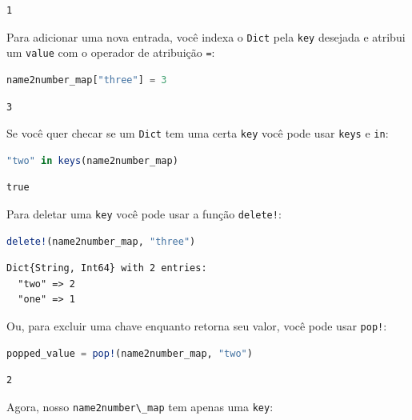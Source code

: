 \documentclass[
  notoc %
]{tufte-book}
\newcommand{\passthrough}[1]{#1}
\begin{document}
\begin{lstlisting}[language=Output]
1
\end{lstlisting}

Para adicionar uma nova entrada, você indexa o
\passthrough{\lstinline!Dict!} pela \passthrough{\lstinline!key!}
desejada e atribui um \passthrough{\lstinline!value!} com o operador de
atribuição \passthrough{\lstinline!=!}:

\begin{lstlisting}[language=Julia]
name2number_map["three"] = 3
\end{lstlisting}

\begin{lstlisting}[language=Output]
3
\end{lstlisting}

Se você quer checar se um \passthrough{\lstinline!Dict!} tem uma certa
\passthrough{\lstinline!key!} você pode usar
\passthrough{\lstinline!keys!} e \passthrough{\lstinline!in!}:

\begin{lstlisting}[language=Julia]
"two" in keys(name2number_map)
\end{lstlisting}

\begin{lstlisting}[language=Output]
true
\end{lstlisting}

Para deletar uma \passthrough{\lstinline!key!} você pode usar a função
\passthrough{\lstinline"delete!"}:

\begin{lstlisting}[language=Julia]
delete!(name2number_map, "three")
\end{lstlisting}

\begin{lstlisting}[language=Output]
Dict{String, Int64} with 2 entries:
  "two" => 2
  "one" => 1
\end{lstlisting}

Ou, para excluir uma chave enquanto retorna seu valor, você pode usar
\passthrough{\lstinline"pop!"}:

\begin{lstlisting}[language=Julia]
popped_value = pop!(name2number_map, "two")
\end{lstlisting}

\begin{lstlisting}[language=Output]
2
\end{lstlisting}

Agora, nosso \passthrough{\lstinline!name2number\_map!} tem apenas uma
\passthrough{\lstinline!key!}:
\end{document}
